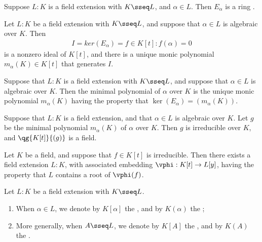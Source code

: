 \documentclass{article}
\begin{document}
  \begin{proposition}
    Suppose $L: K$ is a field extension with $K \sseq L$, and $\alpha\in L$.  Then $E_\alpha$ is a ring \homo.
  \end{proposition}

  \begin{proposition}
    Let $L : K$ be a field extension with $K \sseq L$, and suppose that $\alpha\in L$ is algebraic over $K$.
    Then \begin{align*}
      I = ker(E_\alpha) = {f \in K[t] : f(\alpha) = 0}
    \end{align*}
    is a nonzero ideal of $K[t]$, and there is a unique monic polynomial $m_\alpha(K) \in K[t]$ that generates $I$.
  \end{proposition}

  \begin{definition}
    Suppose that $L : K$ is a field extension with $K \sseq L$, and suppose that $\alpha\in L$ is algebraic over $K$.
    Then the minimal polynomial of $ \alpha $ over $K$ is the unique monic polynomial $m_\alpha(K)$ having the property that $ \ker(E_\alpha) = (m_\alpha(K))$.
  \end{definition}

  \begin{theorem}
    Suppose that $L : K$ is a field extension, and that $\alpha\in L $ is algebraic over $K$.
    Let $g$ be the minimal polynomial $m_\alpha(K)$ of $ \alpha $ over $ K $.
    Then $ g $ is irreducible over $ K $, and $\qg{K[t]}{(g)}$ is a field.
  \end{theorem}

  \begin{theorem}
    Let $ K $ be a field, and suppose that $ f\in K[t] $ is irreducible.
    Then there exists a field extension $ L:K $, with associated embedding $ \vphi:K[t]\to L[y] $, having the property that $ L $ contains a root of $ \vphi(f) $.
  \end{theorem}

  \begin{definition}
    Let $ L:K $ be a field extension with $ K\sseq L $. \begin{enumerate}[label=(\roman*)]
      \item When $\alpha\in L$, we denote by $K[\alpha]$ the , and by $K(\alpha)$ the ;
      \item More generally, when $A\sseq L$, we denote by $K[A]$ the , and by $K(A)$ the .
    \end{enumerate}
  \end{definition}
\end{document}
